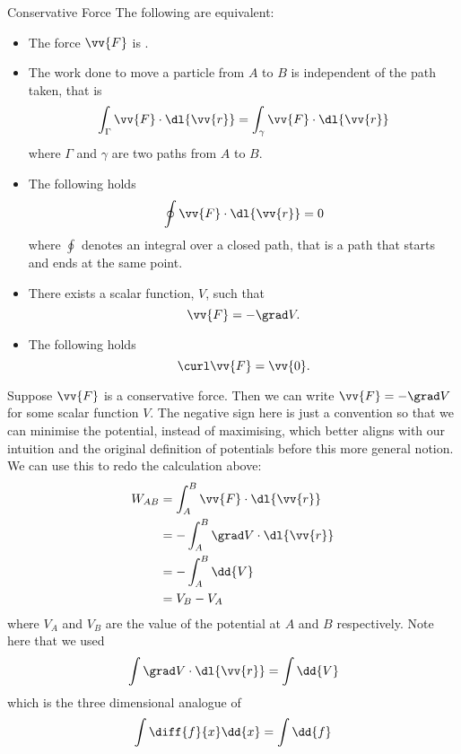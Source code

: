 \documentclass[fleqn]{NotesClass}
\begin{document}
    \begin{dfn}{Conservative Force}{}
        The following are equivalent:
        \begin{itemize}
            \item The force \(\vv{F}\) is .
            \item The work done to move a particle from \(A\) to \(B\) is independent of the path taken, that is
            \begin{equation}
                \int_\Gamma \vv{F}\cdot\dl{\vv{r}} = \int_\gamma \vv{F}\cdot\dl{\vv{r}}
            \end{equation}
            where \(\Gamma\) and \(\gamma\) are two paths from \(A\) to \(B\).
            \item The following holds
            \begin{equation}
                \oint \vv{F}\cdot\dl{\vv{r}} = 0
            \end{equation}
            where \(\oint\) denotes an integral over a closed path, that is a path that starts and ends at the same point.
            \item There exists a scalar function, \(V\), such that
            \begin{equation}
                \vv{F} = -\grad V.
            \end{equation}
            \item The following holds
            \begin{equation}
                \curl\vv{F} = \vv{0}.
            \end{equation}
        \end{itemize}
    \end{dfn}
    
    Suppose \(\vv{F}\) is a conservative force.
    Then we can write \(\vv{F} = -\grad V\) for some scalar function \(V\). The negative sign here is just a convention so that we can minimise the potential, instead of maximising, which better aligns with our intuition and the original definition of potentials before this more general notion.
    We can use this to redo the calculation above:
    \begin{align}
        W_{AB} &= \int_{A}^{B}\vv{F}\cdot\dl{\vv{r}}\\
        &= -\int_A^B \grad V \cdot\dl{\vv{r}}\\
        &= -\int_A^B\dd{V}\\
        &= V_B - V_A\label{eqn:W=Vb-Va}
    \end{align}
    where \(V_A\) and \(V_B\) are the value of the potential at \(A\) and \(B\) respectively.
    Note here that we used
    \begin{equation}
        \int\grad V\cdot\dl{\vv{r}} = \int\dd{V}
    \end{equation}
    which is the three dimensional analogue of
    \begin{equation}
        \int \diff{f}{x}\dd{x} = \int\dd{f}
    \end{equation}
    
\end{document}
